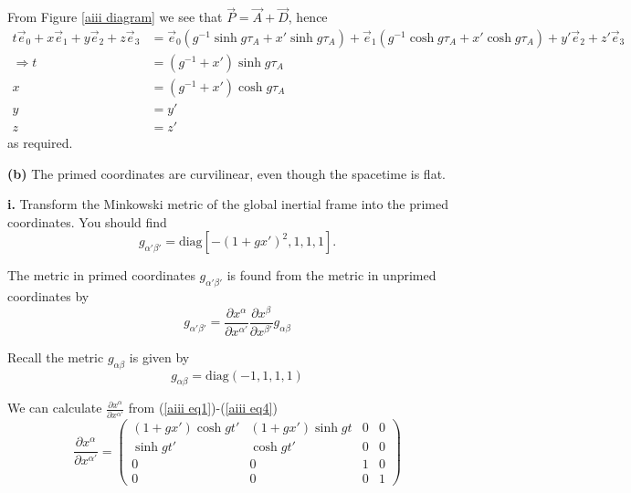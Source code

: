 \documentclass[a4paper]{article} %
\newcommand{\pmx}[1]{\begin{pmatrix}#1\end{pmatrix}}
\begin{document}
From Figure \ref{aiii diagram} we see that $\vec{P}=\vec{A}+\vec{D}$, hence
\begin{align}
t\vec{e}_0+x\vec{e}_1+y\vec{e}_2+z\vec{e}_3
&=\vec{e}_0(g^{-1}\sinh g\tau_A+x'\sinh g\tau_A)
+\vec{e}_1(g^{-1}\cosh g\tau_A+x'\cosh g\tau_A)+y'\vec{e}_2+z'\vec{e}_3\\
\Rightarrow t&=(g^{-1}+x')\sinh g\tau_A\\
x&=(g^{-1}+x')\cosh g\tau_A\\
y&=y'\\
z&=z'
\end{align}
as required.


\begin{framed}
\textbf{(b)} 
The primed coordinates are curvilinear, even though the spacetime is flat.
\end{framed}

\begin{framed}
\textbf{i.} Transform the Minkowski metric of the global inertial frame into the primed coordinates. You should find
\begin{equation}
g_{\alpha' \beta'}=\text{diag}[-(1+gx')^2,1,1,1].\label{primed metric}
\end{equation}
\end{framed}

The metric in primed coordinates $g_{\alpha'\beta'}$ is found from the metric in unprimed coordinates by
\begin{equation}
g_{\alpha'\beta'}=\frac{\partial x^{\alpha}}{\partial x^{\alpha'}}\frac{\partial x^{\beta}}{\partial x^{\beta'}}g_{\alpha\beta}
\end{equation}

Recall the metric $g_{\alpha\beta}$ is given by
\begin{equation}
g_{\alpha\beta}=\text{diag}(-1,1,1,1)\label{Mink metric}
\end{equation}

We can calculate $\frac{\partial x^{\alpha}}{\partial x^{\alpha'}}$ from (\ref{aiii eq1})-(\ref{aiii eq4})
\begin{equation}
\frac{\partial x^{\alpha}}{\partial x^{\alpha'}}=\pmx{(1+gx')\cosh gt'&(1+gx')\sinh gt&0&0\\
\sinh gt'& \cosh gt'&0&0\\
0&0&1&0\\
0&0&0&1} \label{bi matrix diff}
\end{equation}
\end{document}

